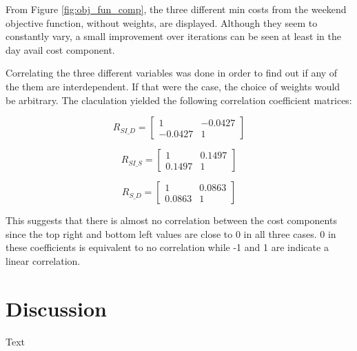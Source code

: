 From Figure \ref{fig:obj_fun_comp}, the three different min costs from the weekend objective function, without weights, are displayed. Although they seem to constantly vary, a small improvement over iterations can be seen at least in the day avail cost component. 

Correlating the three different variables was done in order to find out if any of the them are interdependent. If that were the case, the choice of weights would be arbitrary. The claculation yielded the following correlation coefficient matrices:

\begin{equation}
  R_{SI\_D} =
  \begin{bmatrix}
 	 1  &  -0.0427 \\
 	 -0.0427  &  1
 \end{bmatrix}
\end{equation}

 \begin{equation}
 R_{SI\_S} =
 \begin{bmatrix}
	 1  &  0.1497 \\
	 0.1497  &  1
 \end{bmatrix}
 \end{equation}
 
\begin{equation}
 R_{S\_D} =
 \begin{bmatrix}
	 1  &  0.0863 \\
	 0.0863  &  1
 \end{bmatrix}
 \end{equation} 
 
 This suggests that there is almost no correlation between the cost components since the top right and bottom left values are close to 0 in all three cases. 0 in these coefficients is equivalent to no correlation while -1 and 1 are indicate a linear correlation. 
 

\section{Discussion}
Text


